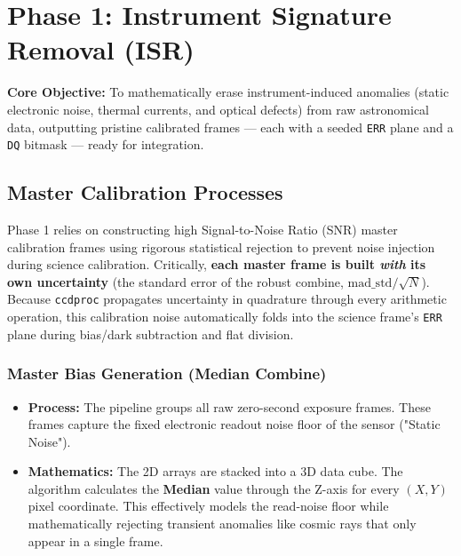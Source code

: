 \documentclass[11pt,a4paper]{article}
\begin{document}
\newpage

\section{Phase 1: Instrument Signature Removal (ISR)}
\textbf{Core Objective:} To mathematically erase instrument-induced anomalies (static electronic noise, thermal currents, and optical defects) from raw astronomical data, outputting pristine calibrated frames --- each with a seeded \texttt{ERR} plane and a \texttt{DQ} bitmask --- ready for integration.

\subsection{Master Calibration Processes}
Phase 1 relies on constructing high Signal-to-Noise Ratio (SNR) master calibration frames using rigorous statistical rejection to prevent noise injection during science calibration. Critically, \textbf{each master frame is built \emph{with} its own uncertainty} (the standard error of the robust combine, $\mathrm{mad\_std}/\sqrt{N}$). Because \texttt{ccdproc} propagates uncertainty in quadrature through every arithmetic operation, this calibration noise automatically folds into the science frame's \texttt{ERR} plane during bias/dark subtraction and flat division.

\subsubsection{Master Bias Generation (Median Combine)}
\begin{itemize}[leftmargin=*]
    \item \textbf{Process:} The pipeline groups all raw zero-second exposure frames. These frames capture the fixed electronic readout noise floor of the sensor ("Static Noise"). 
    \item \textbf{Mathematics:} The 2D arrays are stacked into a 3D data cube. The algorithm calculates the \textbf{Median} value through the Z-axis for every $(X, Y)$ pixel coordinate. This effectively models the read-noise floor while mathematically rejecting transient anomalies like cosmic rays that only appear in a single frame.
\end{itemize}
\end{document}
